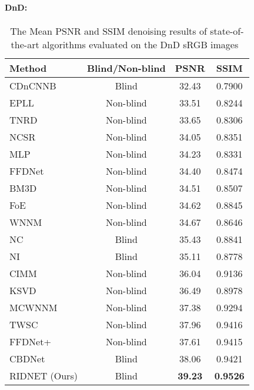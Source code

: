 \documentclass[10pt,twocolumn,letterpaper]{article}
\begin{document}
\paragraph{DnD:} 

\begin{table}
\centering
\begin{tabular}{l||ccc}
\hline \hline
Method      &Blind/Non-blind &PSNR &SSIM \\ \hline \hline
CDnCNNB~\cite{zhang2017DnCNN}  	&Blind 		&32.43 &0.7900\\
EPLL~\cite{Zoran2011EPLL} 		&Non-blind 	&33.51 &0.8244\\
TNRD~\cite{chen2017TNRD}  		&Non-blind 	&33.65 &0.8306\\
NCSR~\cite{dong2012NCSR}  		&Non-blind 	&34.05 &0.8351\\
MLP~\cite{Burger2012MLP}  		&Non-blind 	&34.23 &0.8331\\
FFDNet~\cite{zhang2018ffdnet}  	&Non-blind 	&34.40 &0.8474\\
BM3D~\cite{Dabov2007BM3D}  		&Non-blind 	&34.51 &0.8507\\
FoE~\cite{roth2009fields}  		&Non-blind 	&34.62 &0.8845\\
WNNM~\cite{Gu2014WNN}  		&Non-blind 	&34.67 &0.8646\\
NC~\cite{lebrun2015NC}	        &Blind	&35.43	&0.8841	\\
NI~\cite{NeatI}	    	&Blind	&35.11  &0.8778 \\
CIMM~\cite{anwar2017chaining}  		&Non-blind 	&36.04 &0.9136\\
KSVD~\cite{aharon2006ksvd}  		&Non-blind 	&36.49 &0.8978\\
MCWNNM~\cite{xu2017MCW}  		&Non-blind 	&37.38 &0.9294\\
TWSC~\cite{xu2018TWSC}        &Non-blind	&37.96 &0.9416\\
FFDNet+~\cite{zhang2018ffdnet}		&Non-blind  &37.61 &0.9415\\
CBDNet~\cite{guo2018CBDnet}		&Blind 		&38.06 &0.9421\\
RIDNET (Ours)		&Blind 		&\textbf{39.23} & \textbf{0.9526}\\ \hline \hline
                
\end{tabular}
\caption{The Mean PSNR and SSIM denoising results of state-of-the-art algorithms evaluated on the DnD sRGB images~\cite{plotz2017benchmarking}}
\label{table:DnD}
\vspace*{-5mm}
\end{table}
\end{document}
